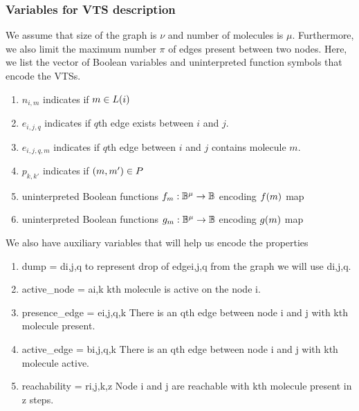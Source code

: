 \subsubsection{Variables for VTS description}
%
We assume that size of the graph is $\nu$ and number of molecules is
$\mu$.
%
Furthermore, we also limit the maximum number $\pi$ of edges present
between two nodes.
%
Here, we list the vector of Boolean variables and uninterpreted function symbols
that encode the VTSs.
\begin{enumerate}

\item $n_{i,m}$ indicates if $m \in L(i)$
\item $e_{i,j,q}$ indicates if $q$th edge exists between $i$ and $j$.
\item $e_{i,j,q,m}$ indicates if $q$th edge between $i$ and $j$ contains molecule $m$.

\item $p_{k,k'}$ indicates if $(m,m') \in P$
\item uninterpreted Boolean functions $f_m : \mathbb{B}^\mu \rightarrow \mathbb{B}$
encoding $f(m)$ map
\item uninterpreted Boolean functions $g_m : \mathbb{B}^\mu \rightarrow \mathbb{B}$
encoding $g(m)$ map
\end{enumerate}

We also have auxiliary variables that will help us encode the properties 
\begin{enumerate}
\item dump = d{i,j,q}
      to represent drop of edge{i,j,q} from the graph we will use d{i,j,q}.        
       
      
\item active\_node = a{i,k} 
      kth molecule is active on the node i.
      
\item presence\_edge = e{i,j,q,k}
      There is an qth edge between node i and j with kth molecule present.

\item active\_edge = b{i,j,q,k}
      There is an qth edge between node i and j with kth molecule active.

\item reachability = r{i,j,k,z}
      Node i and j are reachable with kth molecule present in z steps.


\end{enumerate}



